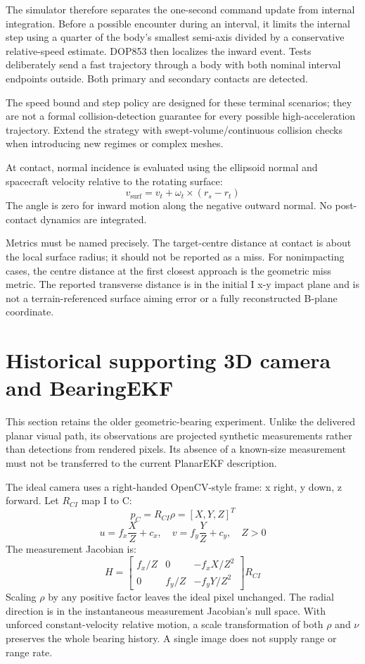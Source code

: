 \documentclass[11pt,a4paper]{article}
\begin{document}
The simulator therefore separates the one-second command update from internal integration. Before a possible encounter during an interval, it limits the internal step using a quarter of the body's smallest semi-axis divided by a conservative relative-speed estimate. DOP853 then localizes the inward event. Tests deliberately send a fast trajectory through a body with both nominal interval endpoints outside. Both primary and secondary contacts are detected.

The speed bound and step policy are designed for these terminal scenarios; they are not a formal collision-detection guarantee for every possible high-acceleration trajectory. Extend the strategy with swept-volume/continuous collision checks when introducing new regimes or complex meshes.

At contact, normal incidence is evaluated using the ellipsoid normal and spacecraft velocity relative to the rotating surface:
\[ v_{\mathrm{surf}} = v_{t} + \omega_{t} \times (r_{s} - r_{t}) \]
The angle is zero for inward motion along the negative outward normal. No post-contact dynamics are integrated.

Metrics must be named precisely. The target-centre distance at contact is about the local surface radius; it should not be reported as a miss. For nonimpacting cases, the centre distance at the first closest approach is the geometric miss metric. The reported transverse distance is in the initial I x-y impact plane and is not a terrain-referenced surface aiming error or a fully reconstructed B-plane coordinate.

\section{Historical supporting 3D camera and BearingEKF}
This section retains the older geometric-bearing experiment. Unlike the delivered planar visual path, its observations are projected synthetic measurements rather than detections from rendered pixels. Its absence of a known-size measurement must not be transferred to the current PlanarEKF description.

The ideal camera uses a right-handed OpenCV-style frame: x right, y down, z forward. Let $R_{CI}$ map I to C:
\[ p_{C} = R_{CI} \rho = [X, Y, Z]^{T} \]
\[ u = f_{x} \frac{X}{Z} + c_{x}, \quad v = f_{y} \frac{Y}{Z} + c_{y}, \quad Z > 0 \]
The measurement Jacobian is:
\[ H = \begin{bmatrix} f_{x}/Z & 0 & -f_{x}X/Z^{2} \\ 0 & f_{y}/Z & -f_{y}Y/Z^{2} \end{bmatrix} R_{CI} \]
Scaling $\rho$ by any positive factor leaves the ideal pixel unchanged. The radial direction is in the instantaneous measurement Jacobian's null space. With unforced constant-velocity relative motion, a scale transformation of both $\rho$ and $\nu$ preserves the whole bearing history. A single image does not supply range or range rate.
\end{document}
